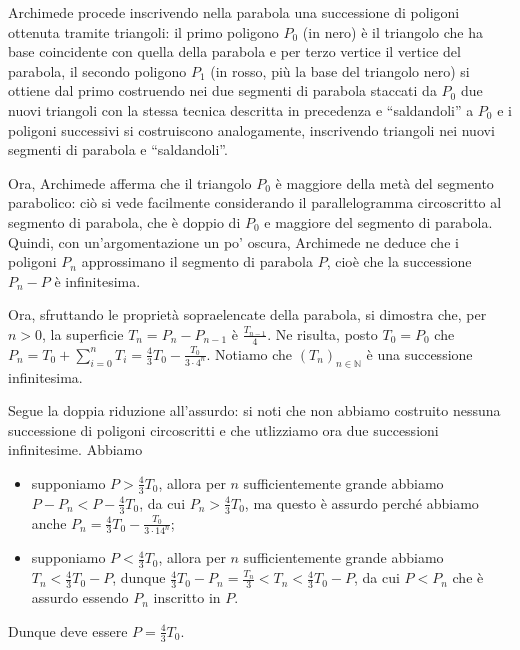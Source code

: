 \par Archimede procede inscrivendo nella parabola una successione di poligoni ottenuta tramite triangoli: il primo poligono $P_0$ (in nero) \`e il triangolo che ha base coincidente con quella della parabola e per terzo vertice il vertice del parabola, il secondo poligono $P_1$ (in rosso, pi\`u la base del triangolo nero) si ottiene dal primo costruendo nei due segmenti di parabola staccati da $P_0$ due nuovi triangoli con la stessa tecnica descritta in precedenza e ``saldandoli'' a $P_0$ e i poligoni successivi si costruiscono analogamente, inscrivendo triangoli nei nuovi segmenti di parabola e ``saldandoli''.
\par Ora, Archimede afferma che il triangolo $P_0$ \`e maggiore della met\`a del segmento parabolico: ci\`o si vede facilmente considerando il parallelogramma circoscritto al segmento di parabola, che \`e doppio di $P_0$ e maggiore del segmento di parabola. Quindi, con un'argomentazione un po' oscura, Archimede ne deduce che i poligoni $P_n$ approssimano il segmento di parabola $P$, cio\`e che la successione $P_n - P$ \`e infinitesima.
\par Ora, sfruttando le propriet\`a sopraelencate della parabola, si dimostra che, per $n > 0$,  la superficie $T_n = P_n - P_{n - 1}$ \`e $\frac{T_{n - 1}}{4}$. Ne risulta, posto $T_0 = P_0$ che $P_n = T_0 + \sum_{i = 0}^n T_i = \frac{4}{3}T_0 - \frac{T_0}{3 \cdot 4^n}$. Notiamo che $(T_n)_{n \in \mathbb{N}}$ \`e una successione infinitesima.
\par Segue la doppia riduzione all'assurdo: si noti che non abbiamo costruito nessuna successione di poligoni circoscritti e che utlizziamo ora due successioni infinitesime. Abbiamo
\begin{itemize}
	\item supponiamo $P > \frac{4}{3}T_0$, allora per $n$ sufficientemente grande abbiamo $P - P_n < P - \frac{4}{3}T_0$, da cui $P_n > \frac{4}{3}T_0$, ma questo \`e assurdo perch\'e abbiamo anche $P_n = \frac{4}{3}T_0 - \frac{T_0}{3 \cdot {1}{4^n}}$;
	\item supponiamo $P < \frac{4}{3}T_0$, allora per $n$ sufficientemente grande abbiamo $T_n < \frac{4}{3}T_0 - P$, dunque $\frac{4}{3}T_0 - P_n = \frac{T_n}{3} < T_n < \frac{4}{3}T_0 - P$, da cui $P < P_n$ che \`e assurdo essendo $P_n$ inscritto in $P$.
\end{itemize}
\par Dunque deve essere $P = \frac{4}{3}T_0$.
